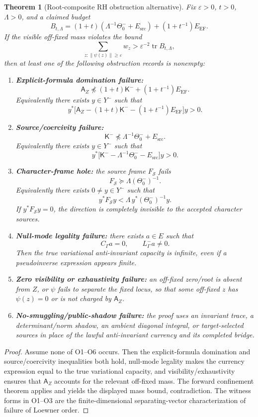 \documentclass[11pt]{article}
\newtheorem{theorem}{Theorem}
\newcommand{\K}{\mathsf K}
\newcommand{\A}{\mathsf A}
\newcommand{\EF}{\mathrm{EF}}
\newcommand{\src}{\mathrm{src}}
\newcommand{\tr}{\operatorname{tr}}
\begin{document}
\begin{theorem}[Root-composite RH obstruction alternative]
Fix $\varepsilon>0$, $t>0$, $\Lambda>0$, and a claimed budget
\[
B_{t,\Lambda}=(1+t)(\Lambda^{-1}\Theta_0^-+E_{\src})+(1+t^{-1})E_{\EF}.
\]
If the visible off-fixed mass violates the bound
\[
\sum_{z:\|\psi(z)\|\ge\varepsilon}w_z
>
\varepsilon^{-2}\tr B_{t,\Lambda},
\]
then at least one of the following obstruction records is nonempty:
\begin{enumerate}[label=O\arabic*.,leftmargin=2.5em]
\item \textbf{Explicit-formula domination failure:}
\[
\A_Z\npreceq (1+t)\K^-+(1+t^{-1})E_{\EF}.
\]
Equivalently there exists $y\in Y^-$ such that
\[
y^*\bigl[\A_Z-(1+t)\K^--(1+t^{-1})E_{\EF}\bigr]y>0.
\]
\item \textbf{Source/coercivity failure:}
\[
\K^-\npreceq \Lambda^{-1}\Theta_0^-+E_{\src}.
\]
Equivalently there exists $y\in Y^-$ such that
\[
y^*\bigl[\K^- -\Lambda^{-1}\Theta_0^- -E_{\src}\bigr]y>0.
\]
\item \textbf{Character-frame hole:} the source frame $F_{\mathcal S}$ fails
\[
F_{\mathcal S}\succeq \Lambda(\Theta_0^-)^{-1}.
\]
Equivalently there exists $0\ne y\in Y^-$ such that
\[
y^*F_{\mathcal S}y<\Lambda\,y^*(\Theta_0^-)^{-1}y.
\]
If $y^*F_{\mathcal S}y=0$, the direction is completely invisible to the accepted character sources.
\item \textbf{Null-mode legality failure:} there exists $a\in E$ such that
\[
C_\Gamma a=0,
\qquad
L^-_\Gamma a\ne0.
\]
Then the true variational anti-invariant capacity is infinite, even if a pseudoinverse expression appears finite.
\item \textbf{Zero visibility or exhaustivity failure:} an off-fixed zero/root is absent from $Z$, or $\psi$ fails to separate the fixed locus, so that some off-fixed $z$ has $\psi(z)=0$ or is not charged by $\A_Z$.
\item \textbf{No-smuggling/public-shadow failure:} the proof uses an invariant trace, a determinant/norm shadow, an ambient diagonal integral, or target-selected sources in place of the lawful anti-invariant currency and its completed bridge.
\end{enumerate}
\end{theorem}

\begin{proof}
Assume none of O1--O6 occurs.  Then the explicit-formula domination and source/coercivity inequalities both hold, null-mode legality makes the currency expression equal to the true variational capacity, and visibility/exhaustivity ensures that $\A_Z$ accounts for the relevant off-fixed mass.  The forward confinement theorem applies and yields the displayed mass bound, contradiction.  The witness forms in O1--O3 are the finite-dimensional separating-vector characterization of failure of Loewner order.
\end{proof}
\end{document}
